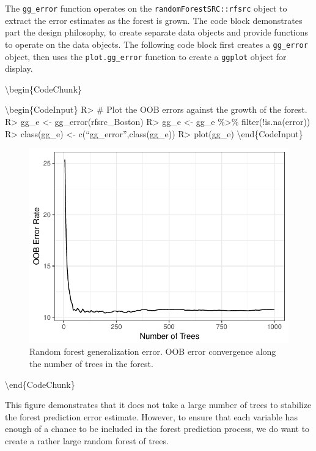 \documentclass[article]{jss}
\begin{document}
The \texttt{gg\_error} function operates on the
\texttt{randomForestSRC::rfsrc} object to extract the error estimates as
the forest is grown. The code block demonstrates part the
 design philosophy, to create separate data objects
and provide functions to operate on the data objects. The following code
block first creates a \texttt{gg\_error} object, then uses the
\texttt{plot.gg\_error} function to create a \texttt{ggplot} object for
display.

\textbackslash{}begin\{CodeChunk\}

\textbackslash{}begin\{CodeInput\} R\textgreater{} \# Plot the OOB
errors against the growth of the forest. R\textgreater{} gg\_e
\textless{}- gg\_error(rfsrc\_Boston) R\textgreater{} gg\_e \textless{}-
gg\_e \%\textgreater{}\% filter(!is.na(error)) R\textgreater{}
class(gg\_e) \textless{}- c(``gg\_error'',class(gg\_e)) R\textgreater{}
plot(gg\_e) \textbackslash{}end\{CodeInput\}

\begin{figure}

{\centering \includegraphics{Regression-rfsrc_files/figure-latex/error-1} 

}

\caption[Random forest generalization error]{Random forest generalization error. OOB error convergence along the number of trees in the forest.}\label{fig:error}
\end{figure}

\textbackslash{}end\{CodeChunk\}

This figure demonstrates that it does not take a large number of trees
to stabilize the forest prediction error estimate. However, to ensure
that each variable has enough of a chance to be included in the forest
prediction process, we do want to create a rather large random forest of
trees.
\end{document}
